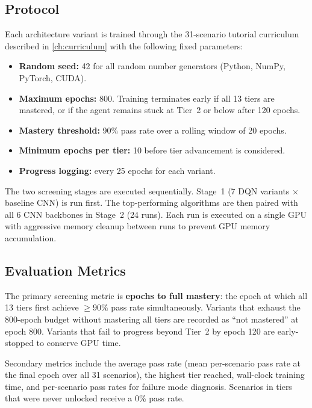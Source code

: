\subsection{Protocol}
\label{sec:exp:phase1:protocol}

Each architecture variant is trained through the 31-scenario tutorial curriculum described in \cref{ch:curriculum} with the following fixed parameters:

\begin{itemize}
  \small
  \item \textbf{Random seed:} 42 for all random number generators (Python, NumPy, PyTorch, CUDA).
  \item \textbf{Maximum epochs:} 800. Training terminates early if all 13 tiers are mastered, or if the agent remains stuck at Tier~2 or below after 120 epochs.
  \item \textbf{Mastery threshold:} 90\% pass rate over a rolling window of 20 epochs.
  \item \textbf{Minimum epochs per tier:} 10 before tier advancement is considered.
  \item \textbf{Progress logging:} every 25 epochs for each variant.
\end{itemize}

The two screening stages are executed sequentially. Stage~1 (7 DQN variants $\times$ baseline CNN) is run first. The top-performing algorithms are then paired with all 6 CNN backbones in Stage~2 (24 runs). Each run is executed on a single GPU with aggressive memory cleanup between runs to prevent GPU memory accumulation.

\subsection{Evaluation Metrics}
\label{sec:exp:phase1:metrics}

The primary screening metric is \textbf{epochs to full mastery}: the epoch at which all 13 tiers first achieve $\geq 90\%$ pass rate simultaneously. Variants that exhaust the 800-epoch budget without mastering all tiers are recorded as ``not mastered'' at epoch 800. Variants that fail to progress beyond Tier~2 by epoch 120 are early-stopped to conserve GPU time.

Secondary metrics include the average pass rate (mean per-scenario pass rate at the final epoch over all 31 scenarios), the highest tier reached, wall-clock training time, and per-scenario pass rates for failure mode diagnosis. Scenarios in tiers that were never unlocked receive a 0\% pass rate.

